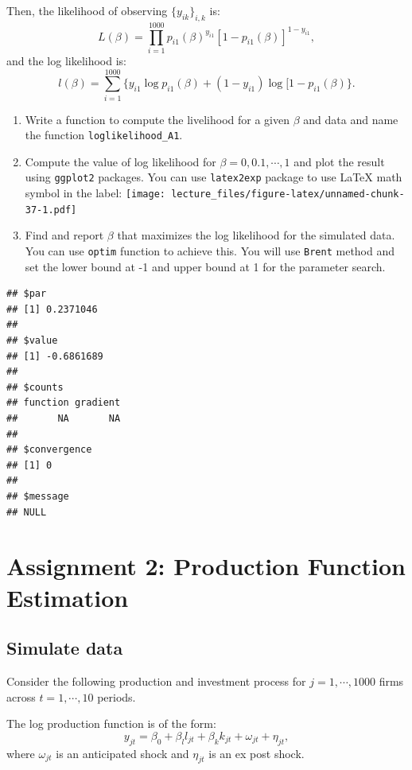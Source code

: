 \documentclass[
]{book}
\begin{document}
Then, the likelihood of observing \(\{y_{ik}\}_{i, k}\) is:
\[
L(\beta) = \prod_{i = 1}^{1000} p_{i1}(\beta)^{y_{i1}} [1 - p_{i1}(\beta)]^{1 - y_{i1}},
\]
and the log likelihood is:
\[
l(\beta) = \sum_{i = 1}^{1000}\{y_{i1}\log p_{i1}(\beta) + (1 - y_{i1})\log [1 - p_{i1}(\beta)\}.
\]

\begin{enumerate}
\def\labelenumi{\arabic{enumi}.}
\item
  Write a function to compute the livelihood for a given \(\beta\) and data and name the function \texttt{loglikelihood\_A1}.
\item
  Compute the value of log likelihood for \(\beta = 0, 0.1, \cdots, 1\) and plot the result using \texttt{ggplot2} packages. You can use \texttt{latex2exp} package to use LaTeX math symbol in the label:
  \texttt{[image: lecture\_files/figure-latex/unnamed-chunk-37-1.pdf]}
\item
  Find and report \(\beta\) that maximizes the log likelihood for the simulated data. You can use \texttt{optim} function to achieve this. You will use \texttt{Brent} method and set the lower bound at -1 and upper bound at 1 for the parameter search.
\end{enumerate}

\begin{verbatim}
## $par
## [1] 0.2371046
## 
## $value
## [1] -0.6861689
## 
## $counts
## function gradient 
##       NA       NA 
## 
## $convergence
## [1] 0
## 
## $message
## NULL
\end{verbatim}

\hypertarget{assignment2}{%
\chapter{Assignment 2: Production Function Estimation}\label{assignment2}}

\hypertarget{simulate-data-1}{%
\section{Simulate data}\label{simulate-data-1}}

Consider the following production and investment process for \(j = 1, \cdots, 1000\) firms across \(t = 1, \cdots, 10\) periods.

The log production function is of the form:
\[
y_{jt} = \beta_0 + \beta_l l_{jt} + \beta_k k_{jt} + \omega_{jt} + \eta_{jt},
\]
where \(\omega_{jt}\) is an anticipated shock and \(\eta_{jt}\) is an ex post shock.
\end{document}

